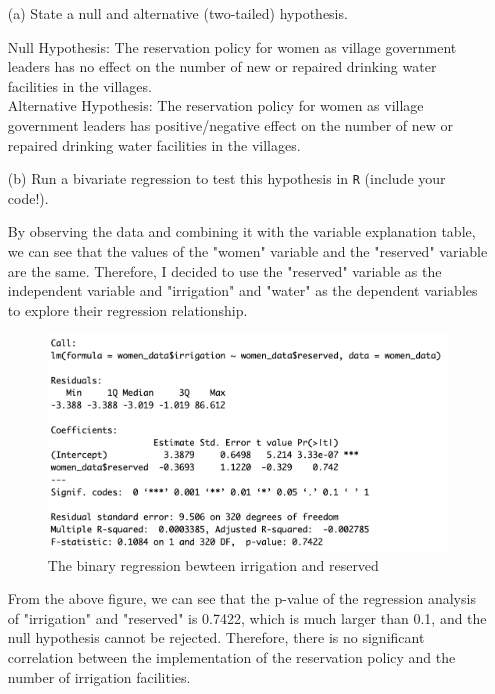 \documentclass[12pt,letterpaper]{article}
\begin{document}
\newpage
\begin{enumerate}
	\item [(a)] State a null and alternative (two-tailed) hypothesis. 
	
	Null Hypothesis: The reservation policy for women as village government leaders has no effect on the number of new or repaired drinking water facilities in the villages.\\
	
	Alternative Hypothesis: The reservation policy for women as village government leaders has positive/negative effect on the number of new or repaired drinking water facilities in the villages.\\
	\item [(b)] Run a bivariate regression to test this hypothesis in \texttt{R} (include your code!).
	
	By observing the data and combining it with the variable explanation table, we can see that the values of the "women" variable and the "reserved" variable are the same. Therefore, I decided to use the "reserved" variable as the independent variable and "irrigation" and "water" as the dependent variables to explore their regression relationship.\\
	\vspace{8cm}
\begin{figure}[h!]
	\caption{\footnotesize{The binary regression bewteen irrigation and reserved}}
	\vspace{.5cm}
	\centering
	\label{fig:2.1 The binary regression bewteen irrigation and reserved}
	\includegraphics[width=1.1\textwidth]{2.1.png}
\end{figure}
	
	From the above figure, we can see that the p-value of the regression analysis of "irrigation" and "reserved" is 0.7422, which is much larger than 0.1, and the null hypothesis cannot be rejected. Therefore, there is no significant correlation between the implementation of the reservation policy and the number of irrigation facilities.\\
	

\end{enumerate}
\end{document}
